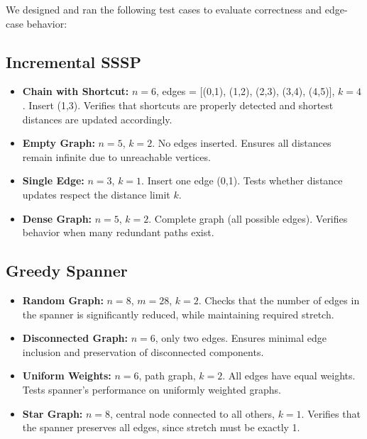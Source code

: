 \documentclass[11pt]{article}
\begin{document}
We designed and ran the following test cases to evaluate correctness and edge-case behavior:

\subsection*{Incremental SSSP}

\begin{itemize}
    \item \textbf{Chain with Shortcut:} $n = 6$, edges = [(0,1), (1,2), (2,3), (3,4), (4,5)], $k = 4$. Insert (1,3). Verifies that shortcuts are properly detected and shortest distances are updated accordingly.
    
    \item \textbf{Empty Graph:} $n = 5$, $k = 2$. No edges inserted. Ensures all distances remain infinite due to unreachable vertices.
    
    \item \textbf{Single Edge:} $n = 3$, $k = 1$. Insert one edge (0,1). Tests whether distance updates respect the distance limit $k$.
    
    \item \textbf{Dense Graph:} $n = 5$, $k = 2$. Complete graph (all possible edges). Verifies behavior when many redundant paths exist.
\end{itemize}

\subsection*{Greedy Spanner}

\begin{itemize}
    \item \textbf{Random Graph:} $n = 8$, $m = 28$, $k = 2$. Checks that the number of edges in the spanner is significantly reduced, while maintaining required stretch.
    
    \item \textbf{Disconnected Graph:} $n = 6$, only two edges. Ensures minimal edge inclusion and preservation of disconnected components.
    
    \item \textbf{Uniform Weights:} $n = 6$, path graph, $k = 2$. All edges have equal weights. Tests spanner's performance on uniformly weighted graphs.
    
    \item \textbf{Star Graph:} $n = 8$, central node connected to all others, $k = 1$. Verifies that the spanner preserves all edges, since stretch must be exactly 1.
\end{itemize}
\end{document}
